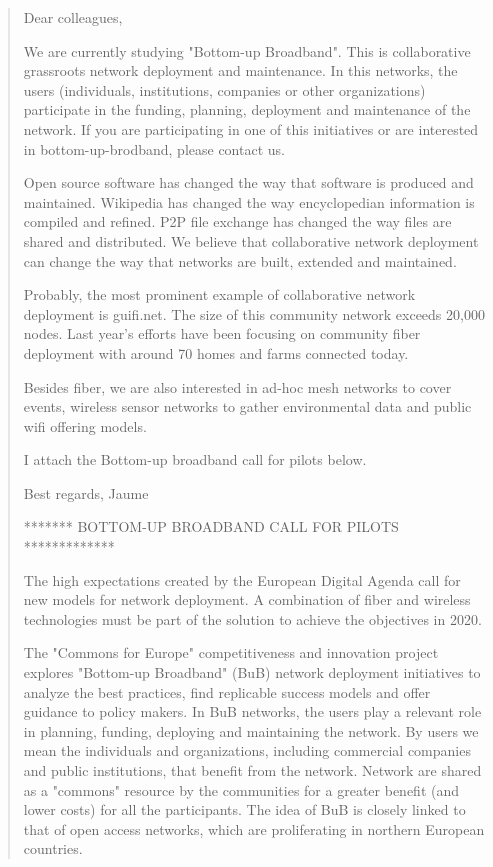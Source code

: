 \documentclass[draftclsnofoot,12pt,journal,onecolumn]{IEEEtran}
\begin{document}
\begin{quotation}
Dear colleagues,

We are currently studying "Bottom-up Broadband". This is collaborative
grassroots network deployment and maintenance. In this networks, the
users (individuals, institutions, companies or other organizations)
participate in the funding, planning, deployment and maintenance of
the network. If you are participating in one of this initiatives or
are interested in bottom-up-brodband, please contact us.

Open source software has changed the way that software is produced and
maintained. Wikipedia has changed the way encyclopedian information is
compiled and refined. P2P file exchange has changed the way files are
shared and distributed. We believe that collaborative network
deployment can change the way that networks are built, extended and
maintained.

Probably, the most prominent example of collaborative network
deployment is guifi.net. The size of this community network exceeds
20,000 nodes. Last year's efforts have been focusing on community
fiber deployment with around 70 homes and farms connected today.

Besides fiber, we are also interested in ad-hoc mesh networks to cover
events, wireless sensor networks to gather environmental data and
public wifi offering models.

I attach the Bottom-up broadband call for pilots below.

Best regards,
Jaume

******* BOTTOM-UP BROADBAND CALL FOR PILOTS *************

The high expectations created by the European Digital Agenda call for
new models for network deployment. A combination of fiber and wireless
technologies must be part of the solution to achieve the objectives in
2020.


The "Commons for Europe" competitiveness and innovation project
explores "Bottom-up Broadband" (BuB) network deployment initiatives to
analyze the best practices, find replicable success models and offer
guidance to policy makers. In BuB networks, the users play a relevant
role in planning, funding, deploying and maintaining the network. By
users we mean the individuals and organizations, including commercial
companies and public institutions, that benefit from the network.
Network are shared as a "commons" resource by the communities for a
greater benefit (and lower costs) for all the participants. The idea
of BuB is closely linked to that of open access networks, which are
proliferating in northern European countries.



\end{quotation}
\end{document}
